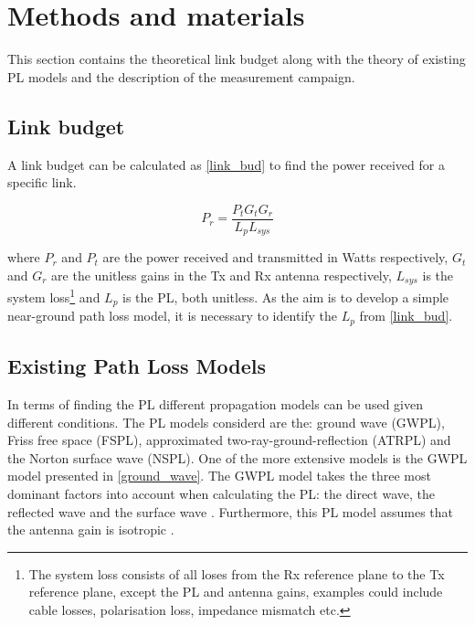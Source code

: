 \section{Methods and materials}
This section contains the theoretical link budget along with the theory of existing PL models and the description of the measurement campaign.

\subsection{Link budget}
A link budget can be calculated as \eqref{link_bud} to find the power received for a specific link.

\begin{equation}
P_{r} = \frac{P_{t}G_{t}G_{r}}{L_{p}L_{sys}}
\label{link_bud}
\end{equation}

where $P_{r}$ and $P_{t}$ are the power received and transmitted in Watts respectively, $G_t$ and $G_r$ are the unitless gains in the Tx and Rx antenna respectively, $L_{sys}$ is the system loss\footnote{The system loss consists of all loses from the Rx reference plane to the Tx reference plane, except the PL and antenna gains, examples could include cable losses, polarisation loss, impedance mismatch etc.} and $L_{p}$ is the PL, both unitless. As the aim is to develop a simple near-ground path loss model, it is necessary to identify the $L_{p}$ from \eqref{link_bud}.


\subsection{Existing Path Loss Models}


In terms of finding the PL different propagation models can be used given different conditions. The PL models considerd are the: ground wave (GWPL), Friss free space (FSPL), approximated two-ray-ground-reflection (ATRPL) and the Norton surface wave (NSPL). One of the more extensive models is the GWPL model presented in \eqref{ground_wave}. The GWPL model takes the three most dominant factors into account when calculating the PL: the direct wave, the reflected wave and the surface wave \cite{Chong,Bullington}. Furthermore, this PL model assumes that the antenna gain is isotropic \cite{Bullington}.  



